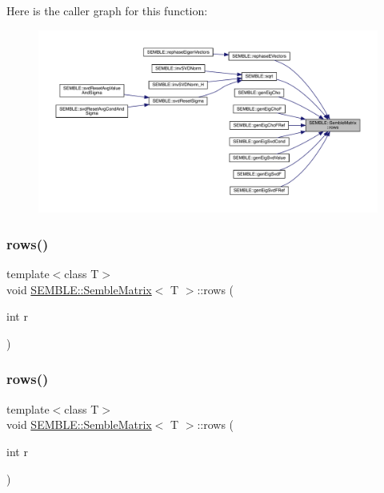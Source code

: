 Here is the caller graph for this function\+:
\nopagebreak
\begin{figure}[H]
\begin{center}
\leavevmode
\includegraphics[width=350pt]{df/d87/structSEMBLE_1_1SembleMatrix_a89cbc720521103b2a30228a3ca3b1e03_icgraph}
\end{center}
\end{figure}
\mbox{\label{structSEMBLE_1_1SembleMatrix_aa489bc3fac488706d97e78519e7334df}} 
\subsubsection{\texorpdfstring{rows()}{rows()}\hspace{0.1cm}{\footnotesize\ttfamily [3/4]}}
{\footnotesize\ttfamily template$<$class T$>$ \\
void \mbox{\hyperlink{structSEMBLE_1_1SembleMatrix}{S\+E\+M\+B\+L\+E\+::\+Semble\+Matrix}}$<$ T $>$\+::rows (\begin{DoxyParamCaption}\item[{int}]{r }\end{DoxyParamCaption})\hspace{0.3cm}{\ttfamily [inline]}}

\mbox{\label{structSEMBLE_1_1SembleMatrix_aa489bc3fac488706d97e78519e7334df}} 
\subsubsection{\texorpdfstring{rows()}{rows()}\hspace{0.1cm}{\footnotesize\ttfamily [4/4]}}
{\footnotesize\ttfamily template$<$class T$>$ \\
void \mbox{\hyperlink{structSEMBLE_1_1SembleMatrix}{S\+E\+M\+B\+L\+E\+::\+Semble\+Matrix}}$<$ T $>$\+::rows (\begin{DoxyParamCaption}\item[{int}]{r }\end{DoxyParamCaption})\hspace{0.3cm}{\ttfamily [inline]}}

